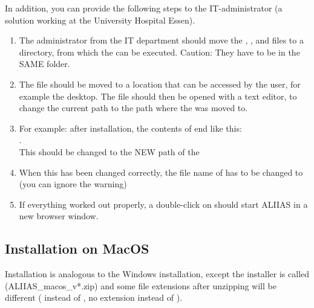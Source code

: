 In addition, you can provide the following steps to the IT-administrator (a solution working at the University Hospital Essen).

\begin{enumerate}
    
    \item The administrator from the IT department should move the , ,  and  files to a directory, from which the  can be executed. Caution: They have to be in the SAME folder. 
    
    \item The  file should be moved to a location that can be accessed by the user, for example the desktop. The file should then be opened with a text editor, to change the current path to the path where the  was moved to.
    \label{item:admin}
    
    \item For example: after installation, the contents of  end like this: \\ . \\ This should be changed to the NEW path of the 
    
    \item When this has been changed correctly, the file name of  has to be changed to  (you can ignore the warning)
    
    \item If everything worked out properly, a double-click on  should start ALIIAS in a new browser window.
\end{enumerate} 

\subsection*{Installation on MacOS}
Installation is analogous to the Windows installation, except the installer is called (ALIIAS\_macos\_v*.zip) and some file extensions after unzipping will be different ( instead of , no extension instead of ).

\vspace{2mm}

\small\setlength\fboxsep{5pt}\setlength\fboxrule{1pt}

\small\setlength\fboxsep{5pt}\setlength\fboxrule{1pt}

